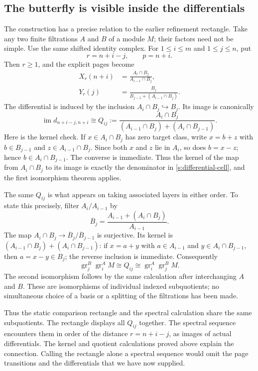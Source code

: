 \documentclass[11pt]{article}
\theoremstyle{definition}
\theoremstyle{remark}\newtheorem{remark}[theorem]{Remark}
\DeclareMathOperator{\im}{im}
\begin{document}
\subsection{The butterfly is visible inside the differentials}

The construction has a precise relation to the earlier refinement
rectangle. Take any two finite filtrations $A$ and $B$ of a module $M$;
their factors need not be simple. Use the same shifted identity complex.
For $1\leq i\leq m$ and $1\leq j\leq n$, put
\[
r=n+i-j,\qquad p=n+i.
\]
Then $r\geq1$, and the explicit pages become
\begin{align*}
X_r(n+i)&=\frac{A_i\cap B_j}{A_{i-1}\cap B_j},\\
Y_r(j)&=\frac{B_j}{B_{j-1}+(A_{i-1}\cap B_j)}.
\end{align*}
The differential is induced by the inclusion $A_i\cap B_j\hookrightarrow
B_j$. Its image is canonically
\begin{equation}\label{s:differential-cell}
\im d_{n+i-j,n+i}\cong
Q_{ij}:=
\frac{A_i\cap B_j}
{(A_{i-1}\cap B_j)+(A_i\cap B_{j-1})}.
\end{equation}
Here is the kernel check. If $x\in A_i\cap B_j$ has zero target class,
write $x=b+z$ with $b\in B_{j-1}$ and $z\in A_{i-1}\cap B_j$.
Since both $x$ and $z$ lie in $A_i$, so does $b=x-z$; hence
$b\in A_i\cap B_{j-1}$. The converse is immediate. Thus the kernel of
the map from $A_i\cap B_j$ to its image is exactly the denominator
in \eqref{s:differential-cell}, and the first isomorphism theorem applies.

The same $Q_{ij}$ is what appears on taking associated layers in either
order. To state this precisely, filter $A_i/A_{i-1}$ by
\[
\overline B_j=\frac{A_{i-1}+(A_i\cap B_j)}{A_{i-1}}.
\]
The map $A_i\cap B_j\to\overline B_j/\overline B_{j-1}$ is surjective.
Its kernel is
$(A_{i-1}\cap B_j)+(A_i\cap B_{j-1})$: if
$x=a+y$ with $a\in A_{i-1}$ and $y\in A_i\cap B_{j-1}$, then
$a=x-y\in B_j$; the reverse inclusion is immediate. Consequently
\[
\operatorname{gr}^{B}_j\operatorname{gr}^{A}_i M
\cong Q_{ij}
\cong\operatorname{gr}^{A}_i\operatorname{gr}^{B}_j M.
\]
The second isomorphism follows by the same calculation after interchanging
$A$ and $B$. These are isomorphisms of individual indexed subquotients;
no simultaneous choice of a basis or a splitting of the filtrations has
been made.

Thus the static comparison rectangle and the spectral calculation share
the same subquotients. The rectangle displays all $Q_{ij}$ together.
The spectral sequence encounters them in order of the distance
$r=n+i-j$, as images of actual differentials. The kernel and quotient
calculations proved above explain the connection. Calling the rectangle
alone a spectral sequence would omit the page transitions and the
differentials that we have now supplied.
\end{document}
